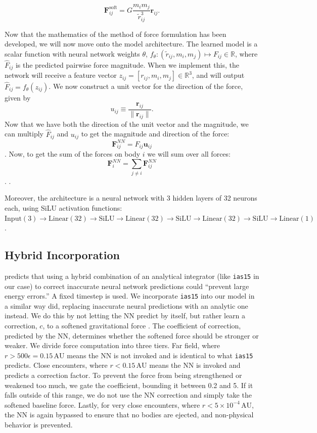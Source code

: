 \documentclass[12pt]{article}
\begin{document}
$$\mathbf{F}_{ij}^{\text{soft}} = G \frac{m_i m_j}{\tilde{r}_{ij}^3} \mathbf{r}_{ij}.$$

Now that the mathematics of the method of force formulation has been developed, we will now move onto the model architecture. The learned model is a scalar function with neural network weights $\theta$, $f_{\theta} : (\tilde{r}_{ij}, m_i, m_j) \mapsto F_{ij} \in \mathbb{R}$, where $\hat{F}_{ij}$ is the predicted pairwise force magnitude. When we implement this, the network will receive a feature vector $z_{ij} = [r_{ij}, m_i, m_j] \in \mathbb{R}^3$, and will output $\hat{F}_{ij} = f_{\theta}(z_{ij})$.
We now construct a unit vector for the direction of the force, given by
$$u_{ij} \equiv \frac{\mathbf{r}_{ij}}{\|\mathbf{r}_{ij}\|}.$$
Now that we have both the direction of the unit vector and the magnitude, we can multiply $\hat{F}_{ij}$ and $u_{ij}$ to get the magnitude and direction of the force: $$\mathbf{F}_{ij}^{NN} = F_{ij} \mathbf{u}_{ij}$$. Now, to get the sum of the forces on body $i$ we will sum over all forces: $$\mathbf{F}_{i}^{NN} = \sum_{j \neq i} \mathbf{F}_{ij}^{NN}$$. \cite{kipf2018neural}.

Moreover, the architecture is a neural network with 3 hidden layers of 32 neurons each, using SiLU activation functions:
$\mathrm{Input}(3) \to \mathrm{Linear}(32) \to \mathrm{SiLU} \to \mathrm{Linear}(32) \to \mathrm{SiLU} \to \mathrm{Linear}(32) \to \mathrm{SiLU} \to \mathrm{Linear}(1)$.

\subsection{Hybrid Incorporation}
\cite{ulibarrena2024hybrid} predicts that using a hybrid combination of an analytical integrator (like \texttt{ias15} in our case) to correct inaccurate neural network predictions could ``prevent large energy errors.'' A fixed timestep is used. We incorporate \texttt{ias15} into our model in a similar way \cite{ulibarrena2024hybrid} did, replacing inaccurate neural predictions with an analytic one instead. We do this by not letting the NN predict by itself, but rather learn a correction, $c$, to a softened gravitational force \cite{kipf2018neural}. The coefficient of correction, predicted by the NN, determines whether the softened force should be stronger or weaker. We divide force computation into three tiers. Far field, where $r > 500\epsilon = 0.15\,\mathrm{AU}$ means the NN is not invoked and is identical to what \texttt{ias15} predicts. Close encounters, where $r < 0.15\,\mathrm{AU}$ means the NN is invoked and predicts a correction factor. To prevent the force from being strengthened or weakened too much, we gate the coefficient, bounding it between 0.2 and 5. If it falls outside of this range, we do not use the NN correction and simply take the softened baseline force. Lastly, for very close encounters, where $r < 5\times10^{-4}\,\mathrm{AU}$, the NN is again bypassed to ensure that no bodies are ejected, and non-physical behavior is prevented.
\end{document}
